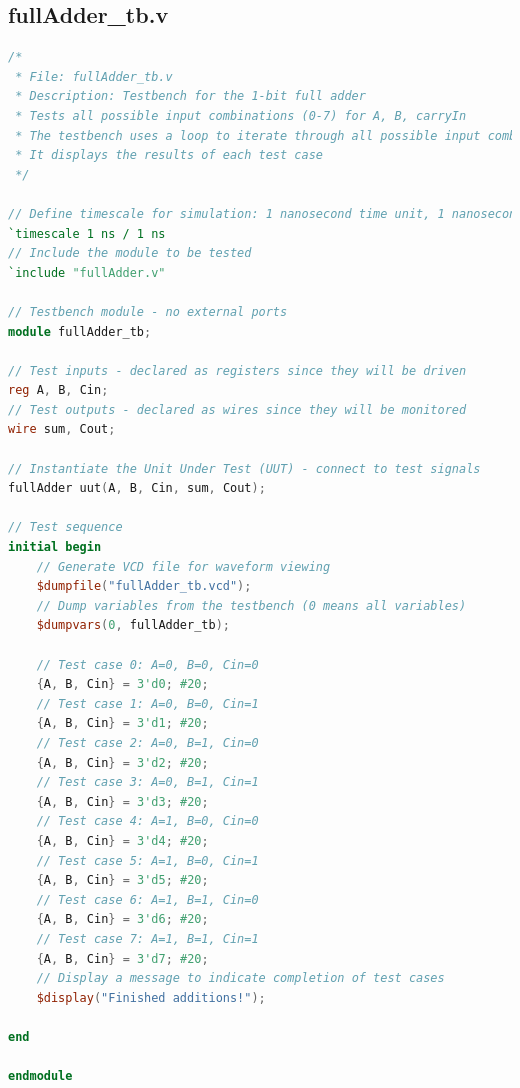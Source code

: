 \documentclass[a4paper,12pt]{article}
\begin{document}
\subsection*{fullAdder\_tb.v}
\begin{lstlisting}[language=Verilog]
/*
 * File: fullAdder_tb.v
 * Description: Testbench for the 1-bit full adder
 * Tests all possible input combinations (0-7) for A, B, carryIn
 * The testbench uses a loop to iterate through all possible input combinations
 * It displays the results of each test case
 */
 
// Define timescale for simulation: 1 nanosecond time unit, 1 nanosecond precision
`timescale 1 ns / 1 ns
// Include the module to be tested
`include "fullAdder.v"

// Testbench module - no external ports
module fullAdder_tb;

// Test inputs - declared as registers since they will be driven
reg A, B, Cin;
// Test outputs - declared as wires since they will be monitored
wire sum, Cout;

// Instantiate the Unit Under Test (UUT) - connect to test signals
fullAdder uut(A, B, Cin, sum, Cout);

// Test sequence
initial begin
    // Generate VCD file for waveform viewing
    $dumpfile("fullAdder_tb.vcd");
    // Dump variables from the testbench (0 means all variables)
    $dumpvars(0, fullAdder_tb);
    
    // Test case 0: A=0, B=0, Cin=0
    {A, B, Cin} = 3'd0; #20;
    // Test case 1: A=0, B=0, Cin=1
    {A, B, Cin} = 3'd1; #20;
    // Test case 2: A=0, B=1, Cin=0
    {A, B, Cin} = 3'd2; #20;
    // Test case 3: A=0, B=1, Cin=1
    {A, B, Cin} = 3'd3; #20;
    // Test case 4: A=1, B=0, Cin=0
    {A, B, Cin} = 3'd4; #20;
    // Test case 5: A=1, B=0, Cin=1
    {A, B, Cin} = 3'd5; #20;
    // Test case 6: A=1, B=1, Cin=0
    {A, B, Cin} = 3'd6; #20;
    // Test case 7: A=1, B=1, Cin=1
    {A, B, Cin} = 3'd7; #20;
    // Display a message to indicate completion of test cases
    $display("Finished additions!");
    
end

endmodule
\end{lstlisting}
\end{document}
